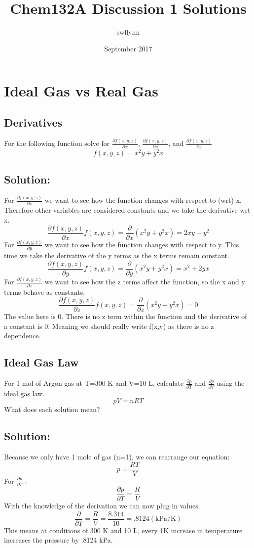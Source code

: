 \documentclass{article}
\title{Chem132A Discussion 1 Solutions}
\author{swflynn }
\date{September 2017}
\newcommand{\be}{\begin{equation}}
\newcommand{\ee}{\end{equation}}
\newcommand{\pd}{\partial}
\begin{document}
\maketitle


\section{Ideal Gas vs Real Gas}

\subsection{Derivatives}
For the following function solve for $\frac{\pd f(x,y,z)}{\pd x}$, $\frac{\pd f(x,y,z)}{\pd y}$, and $\frac{\pd f(x,y,z)}{\pd z}$
\be
f(x,y,z)=x^2y + y^2x
\ee
\subsection*{Solution:}
For $\frac{\pd f(x,y,z)}{\pd x}$ we want to see how the function changes with respect to (wrt) x. Therefore other variables are considered constants and we take the derivative wrt x. 
\be
\frac{\pd f(x,y,z)}{\pd x} f(x,y,z)= \frac{\pd}{\pd x}\left(x^2y + y^2x\right) = 2xy + y^2 
\ee
For $\frac{\pd f(x,y,z)}{\pd y}$ we want to see how the function changes with respect to y. This time we take the derivative of the y terms as the x terms remain constant.
\be
\frac{\pd f(x,y,z)}{\pd y} f(x,y,z)=\frac{\pd}{\pd y}\left(x^2y + y^2x\right) = x^2 + 2yx
\ee
For $\frac{\pd f(x,y,z)}{\pd z}$ we want to see how the z terms affect the function, so the x and y terms behave as constants. 
\be
\frac{\pd f(x,y,z)}{\pd z} f(x,y,z)=\frac{\pd}{\pd z}\left(x^2y + y^2x\right) = 0
\ee
The value here is 0.
There is no z term within the function and the derivative of a constant is 0. Meaning we should really write f(x,y) as there is no z dependence.

\subsection{Ideal Gas Law}
For 1 mol of Argon gas at T=300 K and V=10 L, calculate $\frac{\pd p}{\pd T}$ and $\frac{\pd p}{\pd V}$ using the ideal gas law.
\be
pV=nRT
\ee
What does each solution mean? 

\subsection*{Solution:}
Because we only have 1 mole of gas (n=1), we can rearrange our equation: 
\be
p=\frac{RT}{V}
\ee
For $\frac{\pd p}{\pd T}$ : 
\be
\frac{\pd p}{\pd T} = \frac{R}{V}
\ee
With the knowledge of the derivation we can now plug in values.
\be
\frac{\pd}{\pd T} = \frac{R}{V} = \frac{8.314}{10} = .8124 (\text{kPa/K})
\ee
This means at conditions of 300 K and 10 L, every 1K increase in temperature increases the pressure by .8124 kPa. \\
\end{document}
